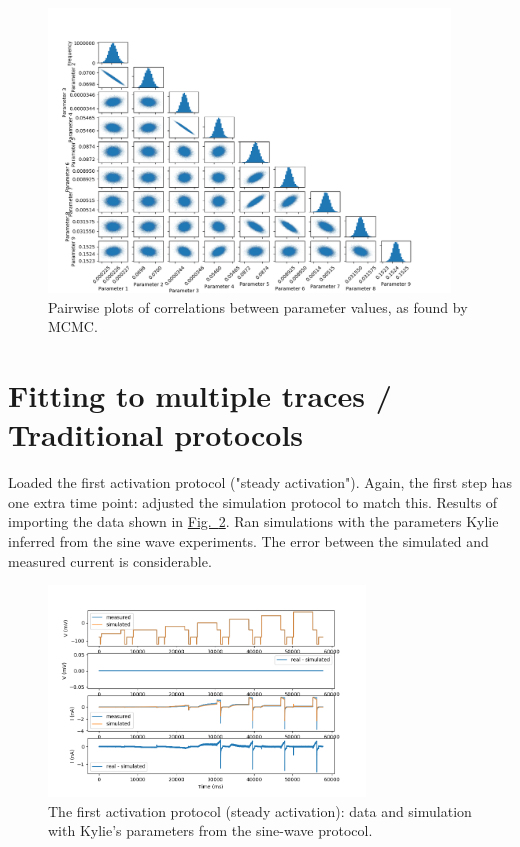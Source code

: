 \documentclass[preprint,authoryear,10pt]{elsarticle}
\newcommand\fig[2][]{\hyperref[fig:#2]{Fig.~\ref*{fig:#2}\ifstrempty{#1}{}{.#1}}}
\begin{document}
\begin{figure}[H]
\centerline{
\includegraphics[width=0.95\textwidth]{fig/sine-wave-mcmc-pairwise}
}
\caption{%
Pairwise plots of correlations between parameter values, as found by MCMC.
}
\label{fig:sine-wave-mcmc-pairwise}
\end{figure}





%
%
%
%
\section{Fitting to multiple traces / Traditional protocols}

Loaded the first activation protocol ("steady activation").
Again, the first step has one extra time point: adjusted the simulation
protocol to match this.
Results of importing the data shown in \fig{steady-activation}.
Ran simulations with the parameters Kylie inferred from the sine wave
 experiments.
The error between the simulated and measured current is considerable.

\begin{figure}[H]
\centerline{
\includegraphics[width=0.75\textwidth]{fig/activation-1-data-and-sim}
}
\caption{%
The first activation protocol (steady activation): data and simulation with
Kylie's parameters from the sine-wave protocol.
}
\label{fig:steady-activation}
\end{figure}
\end{document}
